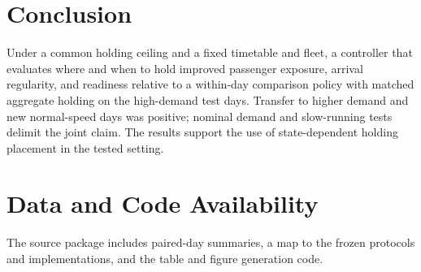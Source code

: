 \documentclass[journal]{IEEEtran}
\begin{document}
\section{Conclusion}
Under a common holding ceiling and a fixed timetable and fleet, a controller that evaluates where and when to hold improved passenger exposure, arrival regularity, and readiness relative to a within-day comparison policy with matched aggregate holding on the high-demand test days. Transfer to higher demand and new normal-speed days was positive; nominal demand and slow-running tests delimit the joint claim. The results support the use of state-dependent holding placement in the tested setting.

\section*{Data and Code Availability}
The source package includes paired-day summaries, a map to the frozen protocols and implementations, and the table and figure generation code.


\end{document}
